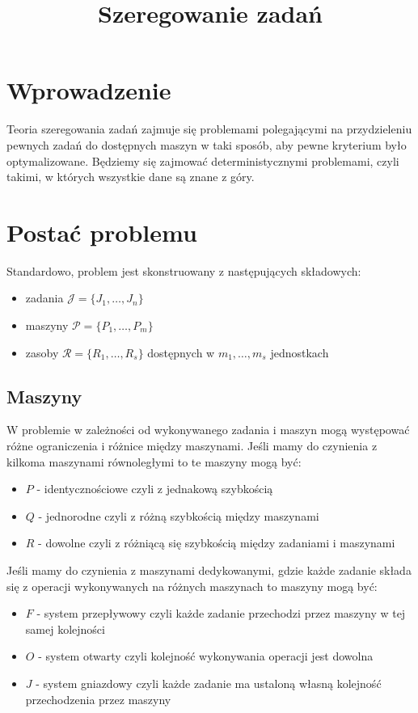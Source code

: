 \documentclass{../notatki}
\title{Szeregowanie zadań}
\begin{document}
\tableofcontents

\section{Wprowadzenie}

Teoria szeregowania zadań zajmuje się problemami polegającymi na przydzieleniu
pewnych zadań do dostępnych maszyn w taki sposób, aby pewne kryterium było
optymalizowane. Będziemy się zajmować deterministycznymi problemami, czyli
takimi, w których wszystkie dane są znane z góry.

\section{Postać problemu}

Standardowo, problem jest skonstruowany z następujących składowych:

\begin{itemize}
  \item zadania $\mathcal{J} = \{J_1, \dots, J_n\}$
  \item maszyny $\mathcal{P} = \{P_1, \dots, P_m\}$
  \item zasoby $\mathcal{R} = \{R_1, \dots, R_s\}$ dostępnych w $m_1,
    \dots, m_s$ jednostkach
\end{itemize}

\subsection{Maszyny}

W problemie w zależności od wykonywanego zadania i maszyn mogą występować
różne ograniczenia i różnice między maszynami. Jeśli mamy do
czynienia z kilkoma maszynami równoległymi to te maszyny mogą być:
\begin{itemize}
  \item $P$ - identycznościowe czyli z jednakową szybkością
  \item $Q$ - jednorodne czyli z różną szybkością między maszynami
  \item $R$ - dowolne czyli z różniącą się szybkością między
    zadaniami i maszynami
\end{itemize}
Jeśli mamy do czynienia z maszynami dedykowanymi, gdzie każde zadanie składa się
z operacji wykonywanych na różnych maszynach to maszyny mogą być:
\begin{itemize}
  \item $F$ - system przepływowy czyli każde zadanie przechodzi przez
    maszyny w tej samej kolejności
  \item $O$ - system otwarty czyli kolejność wykonywania operacji jest dowolna
  \item $J$ - system gniazdowy czyli każde zadanie ma ustaloną własną
    kolejność przechodzenia przez maszyny
\end{itemize}
\end{document}
